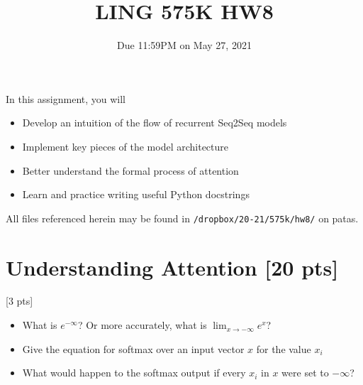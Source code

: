 \documentclass[11pt]{article}
\begin{document}
\title{LING 575K HW8}
\date{\vspace{-0.2in}Due 11:59PM on May 27, 2021}
\maketitle


\noindent In this assignment, you will 
\begin{itemize}
  \item Develop an intuition of the flow of recurrent Seq2Seq models
  \item Implement key pieces of the model architecture
  \item Better understand the formal process of attention
  \item Learn and practice writing useful Python docstrings
\end{itemize}
All files referenced herein may be found in \texttt{/dropbox/20-21/575k/hw8/} on patas.


\section{Understanding Attention [20 pts]}

 \hfill [3 pts]
\begin{itemize}
  \item What is $e^{-\infty}$? Or more accurately, what is $\lim_{x \to -\infty} e^x$?
  \item Give the equation for softmax over an input vector $x$ for the value $x_i$
  \item What would happen to the softmax output if every $x_i$ in $x$ were set to $-\infty$?
\end{itemize}
\end{document}
